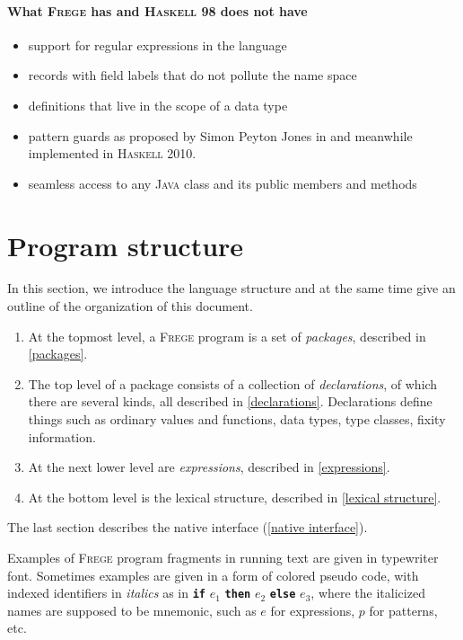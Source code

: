 \documentclass[letterpaper,12pt]{report}
\newcommand{\haskell}[0]{\textsc{Haskell}}
\newcommand{\frege}[0]{\textsc{Frege}}
\newcommand{\java}[0]{\textsc{Java}}
\newcommand{\term}[1]{\textbf{\texttt{\textcolor{trmred}{#1}}}}
\begin{document}
\paragraph{What \frege{} has and \haskell{} 98 does not have}
\begin{itemize}
\item support for regular expressions in the language
\item records with field labels that do not pollute the name space
\item definitions that live in the scope of a data type
\item pattern guards as proposed by Simon Peyton Jones in \cite{pguards}
and meanwhile implemented in \haskell{} 2010.
\item seamless access to any \java{} class and its public members and methods
\end{itemize}

\section{Program structure}

In this section, we introduce the language structure and at the
same time give an outline of the organization of this
document.

\begin{enumerate}

\item At the topmost level, a \frege{} program is a set of
\emph{packages}, described in \autoref{packages}.

\item The top level of a package consists of a collection of
\emph{declarations},
of which there are several kinds, all described in
\autoref{declarations}.
Declarations define things such as ordinary values and functions,
data types,
type classes, fixity information.

\item At the next lower level are \emph{expressions}, described in
\autoref{expressions}.

\item At the bottom level is the lexical structure, described in
\autoref{lexical structure}.

\end{enumerate}

The last section describes  the native interface
(\autoref{native interface}).

Examples of \frege{} program fragments in running text are given in
typewriter font. Sometimes examples are given in a form of
colored pseudo code,
with indexed identifiers in \emph{italics} as in \term{if} $e_1$
\term{then} $e_2$ \term{else} $e_3$, where the  italicized names are
supposed to be mnemonic, such as $e$ for expressions, $p$ for patterns,
etc.
\end{document}

